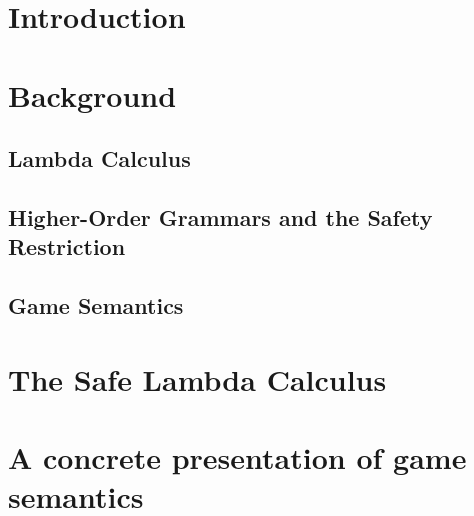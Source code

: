 \begin{romanpages}
\tableofcontents
\listoffigures
\listoftables
\end{romanpages}

\listoftodos
\bigskip

%

\chapter{Introduction}




\chapter{Background}
    \section{Lambda Calculus}
    

    \section{Higher-Order Grammars and the Safety Restriction}
    

    

    \section{Game Semantics}
    

\chapter{The Safe Lambda Calculus}
\label{chap:safelambda}
    
    
    
    
    
    


\chapter{A concrete presentation of game semantics}
    \label{chap:concrete_gamesem}
    


